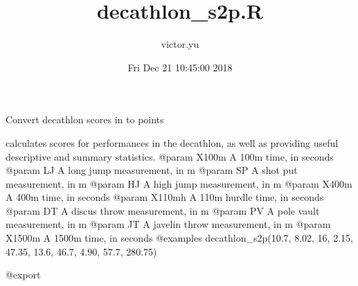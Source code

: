 \documentclass[]{article}
\title{decathlon\_s2p.R}
\author{victor.yu}
\date{Fri Dec 21 10:45:00 2018}
\begin{document}
\maketitle

Convert decathlon scores in to points

 calculates scores for performances in the
decathlon, as well as providing useful descriptive and summary
statistics. @param X100m A 100m time, in seconds @param LJ A long jump
measurement, in m @param SP A shot put measurement, in m @param HJ A
high jump measurement, in m @param X400m A 400m time, in seconds @param
X110mh A 110m hurdle time, in seconds @param DT A discus throw
measurement, in m @param PV A pole vault measurement, in m @param JT A
javelin throw measurement, in m @param X1500m A 1500m time, in seconds
@examples decathlon\_s2p(10.7, 8.02, 16, 2.15, 47.35, 13.6, 46.7, 4.90,
57.7, 280.75)

@export
\end{document}
